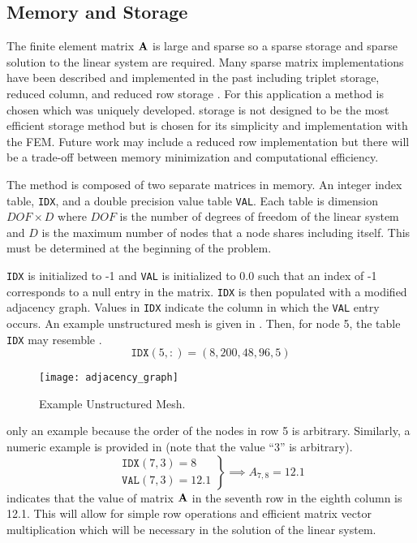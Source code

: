   \subsection{Memory and Storage}
    The finite element matrix $\mathbf{A}$ is large and sparse so a sparse storage and
    sparse solution to the linear system are required. Many sparse matrix 
    implementations have been described and implemented in the past including
    triplet storage, reduced column, and reduced row storage \cite{sparseBLAS}.
    For this application a \twotable method is chosen which was uniquely 
    developed. \twotable storage is not designed to be the most efficient 
    storage method but is chosen for its simplicity and implementation with the 
    FEM. Future work may include a reduced row implementation but there will be
    a trade-off between memory minimization and computational efficiency.
    
    The \twotable method is composed of two separate matrices in memory. An 
    integer index table, \texttt{IDX}, and a double precision value table
    \texttt{VAL}. Each table is dimension $DOF \times D$ where $DOF$ is the
    number of degrees of freedom of the linear system and $D$ is the maximum
    number of nodes that a node shares including itself. This must be determined
    at the beginning of the problem.
    
    \texttt{IDX} is initialized to -1 and \texttt{VAL} is initialized 
    to 0.0 such that an index of -1 corresponds to a null entry in the 
    matrix. \texttt{IDX} is then populated with a modified adjacency graph. 
    Values in \texttt{IDX} indicate the column in which the \texttt{VAL} entry
    occurs. An example unstructured mesh is given in . 
    Then, for node 5, the table \texttt{IDX} may resemble .
    \begin{equation}
      \label{eq:idx_example}
      \texttt{IDX}(5,:) = (8, 200, 48, 96, 5 )
    \end{equation}
    \begin{figure}
      \centering
      \texttt{[image: adjacency\_graph]}
      \caption{Example Unstructured Mesh.}
      \label{fig:adjacency_graph}
    \end{figure}
     only an example because the order of the nodes in row
    5 is arbitrary. Similarly, a numeric example is provided in 
     (note that the value ``3'' is arbitrary).
    \begin{equation}
      \label{eq:idx_number}
      \left.
      \begin{array}{c}
        \texttt{IDX}(7,3) = 8 \\
        \texttt{VAL}(7,3) = 12.1
      \end{array}
      \right\}
      \implies
      A_{7,8} = 12.1
    \end{equation}
     indicates that the value of matrix $\mathbf{A}$ in the
    seventh row in the eighth column is 12.1. This will allow for simple row 
    operations and efficient matrix vector multiplication which will be 
    necessary in the solution of the linear system.

